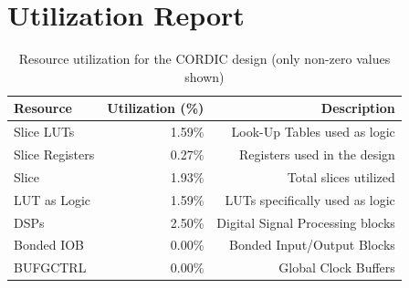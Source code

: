 \section{Utilization Report}
\begin{table}[H]
    \centering
    \small
    \captionsetup{skip=10pt} 
    \begin{tabular}{lrr}
        \hline
        Resource               & Utilization (\%) & Description \\
        \hline
        Slice LUTs             & 1.59\%           & Look-Up Tables used as logic \\
        Slice Registers        & 0.27\%           & Registers used in the design \\
        Slice                  & 1.93\%           & Total slices utilized \\
        LUT as Logic           & 1.59\%           & LUTs specifically used as logic \\
        DSPs                   & 2.50\%           & Digital Signal Processing blocks \\
        Bonded IOB             & 0.00\%           & Bonded Input/Output Blocks \\
        BUFGCTRL               & 0.00\%           & Global Clock Buffers \\
        \hline
    \end{tabular}
    \caption{Resource utilization for the CORDIC design (only non-zero values shown)}
    \label{tab:cordic_resource_utilization}
\end{table}


